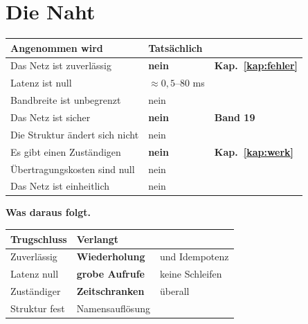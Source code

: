 \chapter{Die Naht}\label{kap:naht}

\begin{merksatz}
\begin{center}
{\small
\renewcommand{\arraystretch}{1.5}
\begin{tabular}{@{}P{3.2cm}P{2.4cm}P{2.4cm}@{}}
\toprule
\textbf{Angenommen wird} & \textbf{Tatsächlich} & \\
\midrule
Das Netz ist zuverlässig & \textcolor{akzent}{\textbf{nein}} & \textbf{Kap.~\ref{kap:fehler}}\\
Latenz ist null & \textcolor{akzent}{$\approx0{,}5$--$80$ ms} & \\
Bandbreite ist unbegrenzt & \textcolor{akzent}{nein} & \\
Das Netz ist sicher & \textcolor{akzent}{\textbf{nein}} & \textbf{Band 19}\\
Die Struktur ändert sich nicht & \textcolor{akzent}{nein} & \\
Es gibt einen Zuständigen & \textcolor{akzent}{\textbf{nein}} & \textcolor{akzent}{\textbf{Kap.~\ref{kap:werk}}}\\
Übertragungskosten sind null & \textcolor{akzent}{nein} & \\
Das Netz ist einheitlich & \textcolor{akzent}{nein} & \\
\bottomrule
\end{tabular}}
\end{center}

\begin{center}
\begin{minipage}{0.88\textwidth}
\end{minipage}
\end{center}

\textbf{Was daraus folgt.}

\begin{center}
\renewcommand{\arraystretch}{1.5}
\begin{tabular}{@{}P{2.8cm}P{2.6cm}P{2.6cm}@{}}
\toprule
\textbf{Trugschluss} & \textbf{Verlangt} & \\
\midrule
Zuverlässig & \textbf{Wieder\-holung} & \textcolor{akzent}{und Idempotenz}\\
Latenz null & \textbf{grobe Aufrufe} & \textcolor{akzent}{keine Schleifen}\\
Zuständiger & \textbf{Zeitschranken} & \textcolor{akzent}{überall}\\
Struktur fest & Namens\-auflösung & \\
\bottomrule
\end{tabular}
\end{center}


\end{merksatz}
